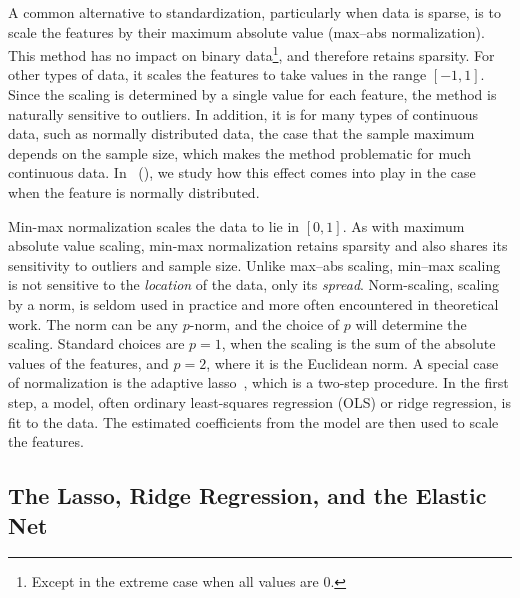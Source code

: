 A common alternative to standardization, particularly when data is sparse, is to scale the
features by their maximum absolute value (max--abs normalization). This method has no
impact on binary data\footnote{Except in the extreme case when all values are 0.}, and
therefore retains sparsity. For other types of data, it scales the features to take values
in the range \([-1, 1]\). Since the scaling is determined by a single value for each
feature, the method is naturally sensitive to outliers. In addition, it is for many types
of continuous data, such as normally distributed data, the case that the sample maximum
depends on the sample size, which makes the method problematic for much continuous data. In
~(), we study how this effect comes into
play in the case when the feature is normally distributed.

Min-max normalization scales the data to lie in \([0, 1]\). As with maximum absolute value
scaling, min-max normalization retains sparsity and also shares its sensitivity to outliers
and sample size. Unlike max--abs scaling, min--max scaling is not sensitive to the
\emph{location} of the data, only its \emph{spread}. Norm-scaling, scaling by a norm, is
seldom used in practice and more often encountered in theoretical work. The norm can be any
\(p\)-norm, and the choice of \(p\) will determine the scaling. Standard choices are
\(p=1\), when the scaling is the sum of the absolute values of the features, and \(p=2\),
where it is the Euclidean norm. A special case of normalization is the adaptive
lasso~\citep{zou2006}, which is a two-step procedure. In the first step, a model, often
ordinary least-squares regression (OLS) or ridge regression, is fit to the data. The
estimated coefficients from the model are then used to scale the features.

\subsection{The Lasso, Ridge Regression, and the Elastic Net}

